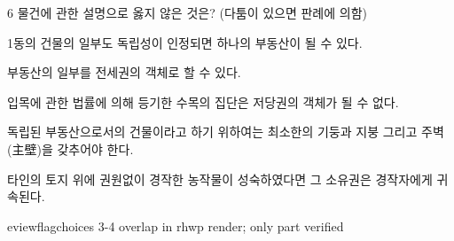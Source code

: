 \begin{question}{6}
물건에 관한 설명으로 옳지 않은 것은? (다툼이 있으면 판례에 의함)
\begin{choices}
  \item 1동의 건물의 일부도 독립성이 인정되면 하나의 부동산이 될 수 있다.
  \item 부동산의 일부를 전세권의 객체로 할 수 있다.
  \item 입목에 관한 법률에 의해 등기한 수목의 집단은 저당권의 객체가 될 수 없다.
  \item 독립된 부동산으로서의 건물이라고 하기 위하여는 최소한의 기둥과 지붕 그리고 주벽(主壁)을 갖추어야 한다.
  \item 타인의 토지 위에 권원없이 경작한 농작물이 성숙하였다면 그 소유권은 경작자에게 귀속된다.
\end{choices}

eviewflag{choices 3-4 overlap in rhwp render; only part verified}
\end{question}
